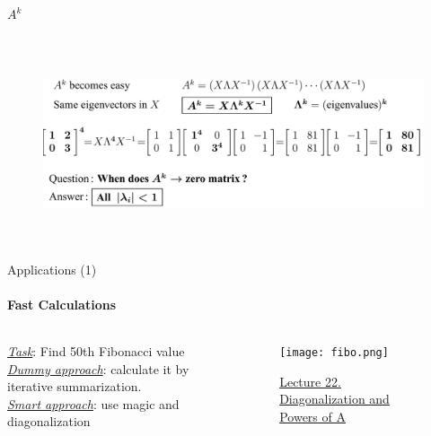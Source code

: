 \documentclass[aspectratio=169]{beamer}
\begin{document}
\begin{frame}[t]{$A^k$}
\framesubtitle{}
    \begin{figure}[H]
        \centering\includegraphics[height=6cm,width=1\textwidth,keepaspectratio]{Power.png}
        \label{fig:Power.png}
    \end{figure}
\end{frame}


\begin{frame}[t]{Applications (1)}
    \framesubtitle{Fast Calculations}
            \begin{columns}[T,onlytextwidth]
                \begin{column}{0.3\textwidth}
                    \underline{\textit{Task}}: Find 50th Fibonacci value \\
\textit{\underline{Dummy approach}}: calculate it by iterative summarization. \\
\underline{\textit{Smart approach}}: use magic and diagonalization \\ 
                \end{column}
                \begin{column}{0.69\textwidth}
                    \vspace{-1cm}
                    \begin{figure}[H]
                        \centering\texttt{[image: fibo.png]}
                        \caption*{ \Large \href{https://youtu.be/13r9QY6cmjc?t=2072}{Lecture 22. Diagonalization and Powers of A}}
                        \label{fig:fibo.jpg}
                    \end{figure}
                \end{column}
            \end{columns}
\end{frame}
\end{document}
